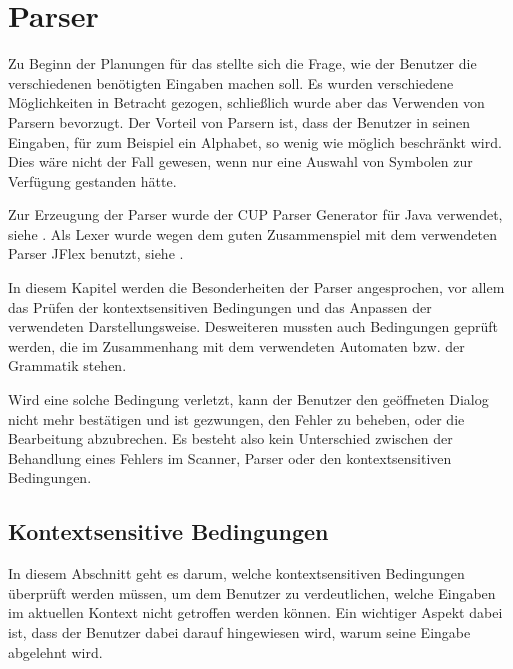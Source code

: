 

\chapter{Parser}\label{Parser}

Zu Beginn der Planungen für das \gtitool stellte sich die Frage, wie der Benutzer
die verschiedenen benötigten Eingaben machen soll. Es wurden verschiedene
Möglichkeiten in Betracht gezogen, schließlich wurde aber das Verwenden von
Parsern bevorzugt. Der Vorteil von Parsern ist, dass der Benutzer in seinen
Eingaben, für zum Beispiel ein Alphabet, so wenig wie möglich beschränkt wird.
Dies wäre nicht der Fall gewesen, wenn nur eine Auswahl von Symbolen zur
Verfügung gestanden hätte.\vspace{10pt}

Zur Erzeugung der Parser wurde der CUP Parser Generator für Java verwendet, siehe
\cite{java-cup}. Als Lexer wurde wegen dem guten Zusammenspiel mit dem
verwendeten Parser JFlex benutzt, siehe \cite{jflex}.\vspace{10pt}

In diesem Kapitel werden die Besonderheiten der Parser angesprochen, vor allem
das Prüfen der kontextsensitiven Bedingungen und das Anpassen der verwendeten
Darstellungsweise. Desweiteren mussten auch Bedingungen geprüft werden, die im
Zusammenhang mit dem verwendeten Automaten bzw. der Grammatik
stehen.\vspace{10pt}

Wird eine solche Bedingung verletzt, kann der Benutzer den geöffneten Dialog
nicht mehr bestätigen und ist gezwungen, den Fehler zu beheben, oder die
Bearbeitung abzubrechen. Es besteht also kein Unterschied zwischen der
Behandlung eines Fehlers im Scanner, Parser oder den kontextsensitiven
Bedingungen.\vspace{10pt}


\section{Kontextsensitive Bedingungen}\label{ParserContext}

In diesem Abschnitt geht es darum, welche kontextsensitiven Bedingungen
über\-prüft werden müssen, um dem Benutzer zu verdeutlichen, welche Eingaben
im aktuellen Kontext nicht getroffen werden können. Ein wichtiger Aspekt dabei
ist, dass der Benutzer dabei darauf hingewiesen wird, warum seine Eingabe
abgelehnt wird.\vspace{10pt}

